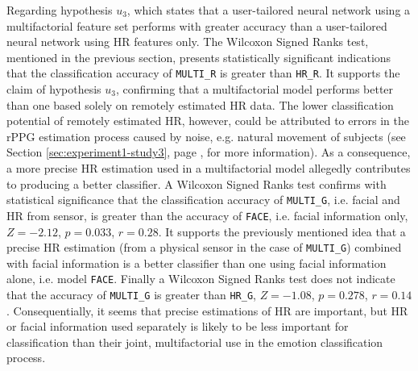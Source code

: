 Regarding hypothesis $u_3$, which states that a user-tailored neural network using a multifactorial feature set performs with greater accuracy than a user-tailored neural network using HR features only. The Wilcoxon Signed Ranks test, mentioned in the previous section, presents statistically significant indications that the classification accuracy of \texttt{MULTI\_R} is greater than \texttt{HR\_R}. It supports the claim of hypothesis $u_3$, confirming that a multifactorial model performs better than one based solely on remotely estimated HR data. The lower classification potential of remotely estimated HR, however, could be attributed to errors in the rPPG estimation process caused by noise, e.g. natural movement of subjects (see Section \ref{sec:experiment1-study3}, page \pageref{sec:experiment1-study3}, for more information). As a consequence, a more precise HR estimation used in a multifactorial model allegedly contributes to producing a better classifier. A Wilcoxon Signed Ranks test confirms with statistical significance that the classification accuracy of \texttt{MULTI\_G}, i.e. facial and HR from sensor, is greater than the accuracy of \texttt{FACE}, i.e. facial information only, $Z=-2.12$, $p=0.033$, $r=0.28$. It supports the previously mentioned idea that a precise HR estimation (from a physical sensor in the case of \texttt{MULTI\_G}) combined with facial information is a better classifier than one using facial information alone, i.e. model \texttt{FACE}. Finally a Wilcoxon Signed Ranks test does not indicate that the accuracy of \texttt{MULTI\_G} is greater than \texttt{HR\_G}, $Z=-1.08$, $p=0.278$, $r=0.14$. Consequentially, it seems that precise estimations of HR are important, but HR or facial information used separately is likely to be less important for classification than their joint, multifactorial use in the emotion classification process.

